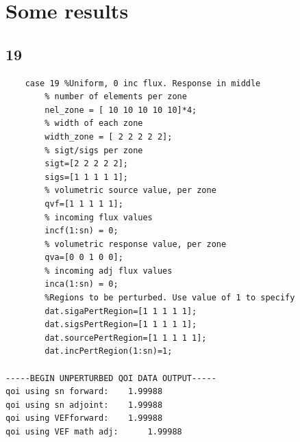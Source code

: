 \documentclass{article}
\begin{document}
\section{Some results}
\newpage
\subsection{19}
\begin{verbatim}
    case 19 %Uniform, 0 inc flux. Response in middle
        % number of elements per zone
        nel_zone = [ 10 10 10 10 10]*4;
        % width of each zone
        width_zone = [ 2 2 2 2 2];
        % sigt/sigs per zone
        sigt=[2 2 2 2 2];
        sigs=[1 1 1 1 1];
        % volumetric source value, per zone
        qvf=[1 1 1 1 1];
        % incoming flux values
        incf(1:sn) = 0;
        % volumetric response value, per zone
        qva=[0 0 1 0 0];
        % incoming adj flux values
        inca(1:sn) = 0;
        %Regions to be perturbed. Use value of 1 to specify
        dat.sigaPertRegion=[1 1 1 1 1];
        dat.sigsPertRegion=[1 1 1 1 1];
        dat.sourcePertRegion=[1 1 1 1 1];
        dat.incPertRegion(1:sn)=1;
        
-----BEGIN UNPERTURBED QOI DATA OUTPUT----- 
qoi using sn forward: 	 1.99988 
qoi using sn adjoint: 	 1.99988 
qoi using VEFforward: 	 1.99988 
qoi using VEF math adj: 	 1.99988 
\end{verbatim}
\end{document}

